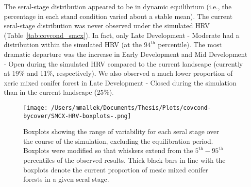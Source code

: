 The seral-stage distribution appeared to be in dynamic equilibrium (i.e., the percentage in each stand condition varied about a stable mean). The current seral-stage distribution was never observed under the simulated HRV (Table~\ref{tab:covcond_smcx}). In fact, only Late Development - Moderate had a distribution within the simulated HRV (at the $94^{\text{th}}$ percentile). The most dramatic departure was the increase in Early Development and Mid Development - Open during the simulated HRV compared to the current landscape (currently at 19\% and 11\%, respectively). We also observed a much lower proportion of xeric mixed conifer forest in Late Development - Closed during the simulation than in the current landscape (25\%). 


\begin{figure}[!htbp]
  \centering
    \texttt{[image: /Users/mmallek/Documents/Thesis/Plots/covcond-bycover/SMCX-HRV-boxplots-.png]}
  \caption{Boxplots showing the range of variability for each seral stage over the course of the simulation, excluding the equilibration period. Boxplots were modified so that whiskers extend from the $5^{\text{th}} - 95^{\text{th}}$ percentiles of the observed results. Thick black bars in line with the boxplots denote the current proportion of mesic mixed conifer forests in a given seral stage.} 
  \label{fig:covcond_smcx_boxplots}
\end{figure}

